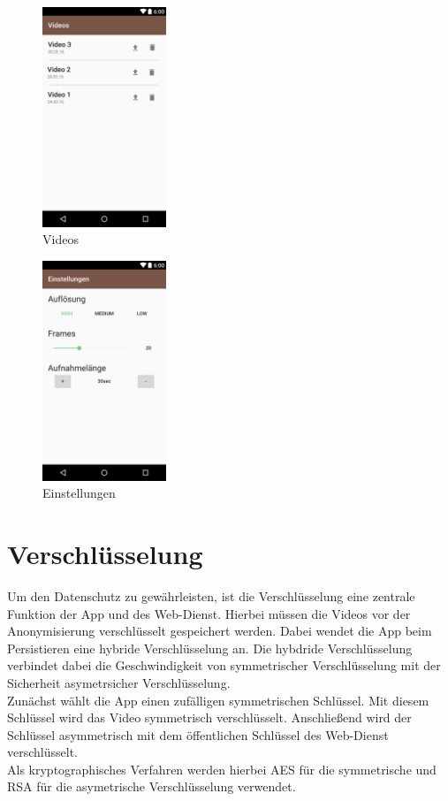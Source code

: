 \begin{figure}
	\centering
	\includegraphics[width=0.33\textwidth]{subtopicsFuncspec/Res/Mockups/Videos_list1.png}
	\caption{Videos}
\end{figure}
\begin{figure}
	\centering
	\includegraphics[width=0.33\textwidth]{subtopicsFuncspec/Res/Mockups/Settings1.png}
 	 \caption{Einstellungen}
\end{figure}

\newpage

\section{Verschlüsselung} \label{sec:Verschlüsselung}

Um den Datenschutz zu gewährleisten, ist die Verschl\"usselung eine zentrale Funktion der App und des Web-Dienst. Hierbei m\"ussen die Videos vor der Anonymisierung verschlüsselt gespeichert werden. Dabei wendet die App beim Persistieren eine hybride Verschlüsselung an. Die hybdride Verschlüsselung verbindet dabei die Geschwindigkeit von symmetrischer Verschlüsselung mit der Sicherheit asymetrsicher Verschlüsselung.\\
Zunächst wählt die App einen zufälligen symmetrischen Schlüssel. Mit diesem Schlüssel wird das Video symmetrisch verschlüsselt. Anschließend wird der Schlüssel asymmetrisch mit dem öffentlichen Schlüssel des Web-Dienst verschlüsselt. \\
Als kryptographisches Verfahren werden hierbei AES für die symmetrische und RSA für die asymetrische Verschlüsselung verwendet.


